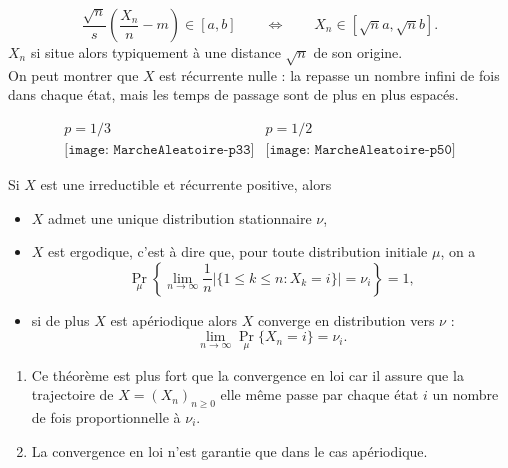 {\begin{description}
    $$
    \frac{\sqrt{n}}{s}\left(\frac{X_n}n - m\right) \in [a, b]
    \qquad \Leftrightarrow \qquad
    X_n \in [\sqrt{n}a, \sqrt{n}b].
    $$
    $X_n$ si situe alors typiquement à une distance $\sqrt{n}$ de son origine. \\
    On peut montrer que $X$ est récurrente nulle : la \cM repasse un nombre infini de fois dans chaque état, mais les temps de passage sont de plus en plus espacés.
  \end{description}
  $$
  \begin{array}{cc}
    p = 1/3 & p = 1/2 \\
    \texttt{[image: MarcheAleatoire-p33]} & 
    \texttt{[image: MarcheAleatoire-p50]} 
  \end{array}
  $$
}


\begin{theorem}
  Si $X$ est une \cM irreductible et récurrente positive, alors 
  \begin{itemize}
   \item $X$ admet une unique distribution stationnaire $\nu$,
   \item $X$ est ergodique, c'est à dire que, pour toute distribution initiale $\mu$, on a
   $$
   \Pr_\mu\left\{\lim_{n \to \infty} \frac1n \left|\{1 \leq k \leq n: X_k = i\}\right| = \nu_i\right\} = 1,
   $$
   \item si de plus $X$ est apériodique alors $X$ converge en distribution vers $\nu$ : 
   $$
   \lim_{n \to \infty} \Pr_\mu\{X_n = i\} = \nu_i.
   $$
  \end{itemize}
\end{theorem}

\remarks
\begin{enumerate}
 \item Ce théorème est plus fort que la convergence en loi car il assure que la trajectoire de $X = (X_n)_{n \geq 0}$ elle même passe par chaque état $i$ un nombre de fois proportionnelle à $\nu_i$.
 \item La convergence en loi n'est garantie que dans le cas apériodique.
\end{enumerate}


